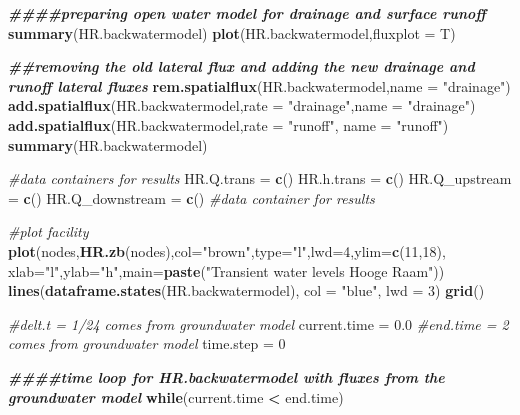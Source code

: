\documentclass[
]{article}
\newenvironment{Shaded}{\begin{snugshade}}{\end{snugshade}}
\newcommand{\AttributeTok}[1]{\textcolor[rgb]{0.13,0.29,0.53}{#1}}
\newcommand{\CommentTok}[1]{\textcolor[rgb]{0.56,0.35,0.01}{\textit{#1}}}
\newcommand{\ControlFlowTok}[1]{\textcolor[rgb]{0.13,0.29,0.53}{\textbf{#1}}}
\newcommand{\DecValTok}[1]{\textcolor[rgb]{0.00,0.00,0.81}{#1}}
\newcommand{\DocumentationTok}[1]{\textcolor[rgb]{0.56,0.35,0.01}{\textbf{\textit{#1}}}}
\newcommand{\FloatTok}[1]{\textcolor[rgb]{0.00,0.00,0.81}{#1}}
\newcommand{\FunctionTok}[1]{\textcolor[rgb]{0.13,0.29,0.53}{\textbf{#1}}}
\newcommand{\NormalTok}[1]{#1}
\newcommand{\OtherTok}[1]{\textcolor[rgb]{0.56,0.35,0.01}{#1}}
\newcommand{\SpecialCharTok}[1]{\textcolor[rgb]{0.81,0.36,0.00}{\textbf{#1}}}
\newcommand{\StringTok}[1]{\textcolor[rgb]{0.31,0.60,0.02}{#1}}
\begin{document}
\begin{Shaded}
\begin{Highlighting}[]
\DocumentationTok{\#\#\#\#preparing open water model for drainage and surface runoff}
\FunctionTok{summary}\NormalTok{(HR.backwatermodel)}
\FunctionTok{plot}\NormalTok{(HR.backwatermodel,}\AttributeTok{fluxplot =}\NormalTok{ T)}

\DocumentationTok{\#\#removing the old lateral flux and adding the new drainage and runoff lateral fluxes}
\FunctionTok{rem.spatialflux}\NormalTok{(HR.backwatermodel,}\AttributeTok{name =} \StringTok{"drainage"}\NormalTok{)}
\FunctionTok{add.spatialflux}\NormalTok{(HR.backwatermodel,}\AttributeTok{rate =} \StringTok{"drainage"}\NormalTok{,}\AttributeTok{name =} \StringTok{"drainage"}\NormalTok{)}
\FunctionTok{add.spatialflux}\NormalTok{(HR.backwatermodel,}\AttributeTok{rate =} \StringTok{"runoff"}\NormalTok{, }\AttributeTok{name =} \StringTok{"runoff"}\NormalTok{)}
\FunctionTok{summary}\NormalTok{(HR.backwatermodel)}


\CommentTok{\#data containers for results}
\NormalTok{HR.Q.trans }\OtherTok{=} \FunctionTok{c}\NormalTok{()}
\NormalTok{HR.h.trans }\OtherTok{=} \FunctionTok{c}\NormalTok{()}
\NormalTok{HR.Q\_upstream }\OtherTok{=} \FunctionTok{c}\NormalTok{()}
\NormalTok{HR.Q\_downstream }\OtherTok{=} \FunctionTok{c}\NormalTok{()}
\CommentTok{\#data container for results}

\CommentTok{\#plot facility}
\FunctionTok{plot}\NormalTok{(nodes,}\FunctionTok{HR.zb}\NormalTok{(nodes),}\AttributeTok{col=}\StringTok{"brown"}\NormalTok{,}\AttributeTok{type=}\StringTok{"l"}\NormalTok{,}\AttributeTok{lwd=}\DecValTok{4}\NormalTok{,}\AttributeTok{ylim=}\FunctionTok{c}\NormalTok{(}\DecValTok{11}\NormalTok{,}\DecValTok{18}\NormalTok{),}
     \AttributeTok{xlab=}\StringTok{"l"}\NormalTok{,}\AttributeTok{ylab=}\StringTok{"h"}\NormalTok{,}\AttributeTok{main=}\FunctionTok{paste}\NormalTok{(}\StringTok{"Transient water levels Hooge Raam"}\NormalTok{))}
\FunctionTok{lines}\NormalTok{(}\FunctionTok{dataframe.states}\NormalTok{(HR.backwatermodel), }\AttributeTok{col =} \StringTok{"blue"}\NormalTok{, }\AttributeTok{lwd =} \DecValTok{3}\NormalTok{)}
\FunctionTok{grid}\NormalTok{()}

\CommentTok{\#delt.t = 1/24 comes from groundwater model}
\NormalTok{current.time }\OtherTok{=} \FloatTok{0.0}
\CommentTok{\#end.time = 2 comes from groundwater model}
\NormalTok{time.step }\OtherTok{=} \DecValTok{0}

\DocumentationTok{\#\#\#\#time loop for HR.backwatermodel with fluxes from the groundwater model}
\ControlFlowTok{while}\NormalTok{(current.time }\SpecialCharTok{\textless{}}\NormalTok{ end.time)}


\end{Highlighting}
\end{Shaded}
\end{document}
